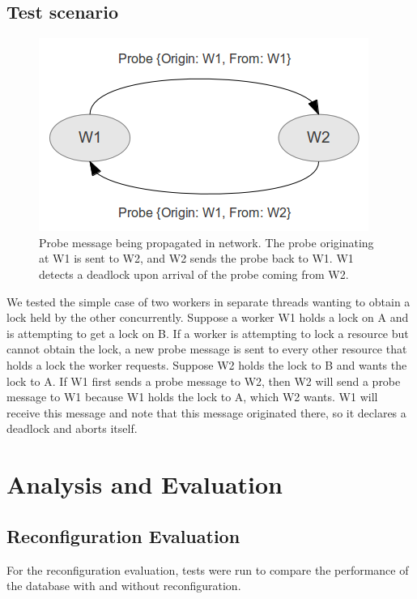 \documentclass[a4paper, 10pt, notitlepage]{article}
\begin{document}
\subsection{Test scenario}
\begin{figure}[h!]

  \centering
    \includegraphics[scale=0.9]{deadlock-message.png}
  \caption{Probe message being propagated in network. The probe originating at W1 is sent to W2, and W2 sends the probe back to W1. W1 detects a deadlock upon arrival of the probe coming from W2.}
\end{figure}

We tested the simple case of two workers in separate threads wanting to obtain a lock held by the other concurrently. Suppose a worker W1 holds a lock on A and is attempting to get a lock on B. If a worker is attempting to lock a resource but cannot obtain the lock, a new probe message is sent to every other resource that holds a lock the worker requests. Suppose W2 holds the lock to B and wants the lock to A. If W1 first sends a probe message to W2, then W2 will send a probe message to W1 because W1 holds the lock to A, which W2 wants. W1 will receive this message and note that this message originated there, so it declares a deadlock and aborts itself.


\section{Analysis and Evaluation}

\subsection{Reconfiguration Evaluation}

For the reconfiguration evaluation, tests were run to compare the performance of the database with and without reconfiguration.
\end{document}
